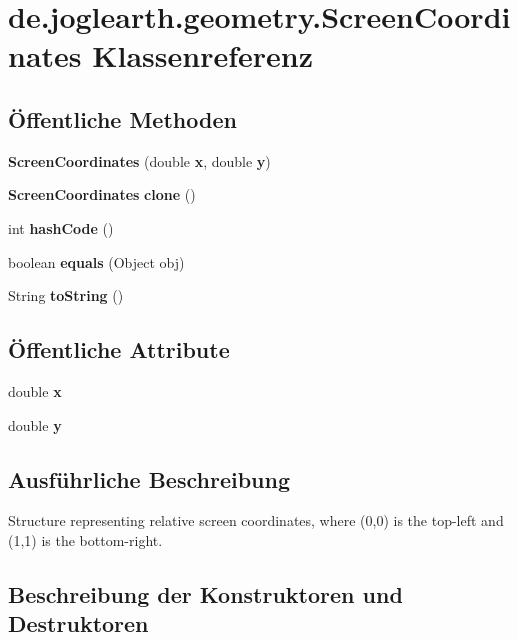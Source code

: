 \section{de.\-joglearth.\-geometry.\-Screen\-Coordinates \-Klassenreferenz}
\label{classde_1_1joglearth_1_1geometry_1_1_screen_coordinates}
\subsection*{Öffentliche \-Methoden}
\begin{DoxyCompactItemize}
\item 
{\bf \-Screen\-Coordinates} (double {\bf x}, double {\bf y})
\item 
{\bf \-Screen\-Coordinates} {\bfseries clone} ()\label{classde_1_1joglearth_1_1geometry_1_1_screen_coordinates_a331deb737a91c46e453ea2ea1639ca0e}

\item 
int {\bfseries hash\-Code} ()\label{classde_1_1joglearth_1_1geometry_1_1_screen_coordinates_a7e35e8e493e19c3e0e0af19408423fab}

\item 
boolean {\bfseries equals} (\-Object obj)\label{classde_1_1joglearth_1_1geometry_1_1_screen_coordinates_a2471c92c5ffd1a500a647e86b316510c}

\item 
\-String {\bfseries to\-String} ()\label{classde_1_1joglearth_1_1geometry_1_1_screen_coordinates_aebaa9728690fe826983dc18e09f4fa07}

\end{DoxyCompactItemize}
\subsection*{Öffentliche \-Attribute}
\begin{DoxyCompactItemize}
\item 
double {\bf x}
\item 
double {\bf y}
\end{DoxyCompactItemize}


\subsection{\-Ausführliche \-Beschreibung}
\-Structure representing relative screen coordinates, where (0,0) is the top-\/left and (1,1) is the bottom-\/right. 

\subsection{\-Beschreibung der \-Konstruktoren und \-Destruktoren}
